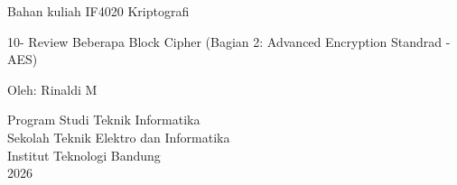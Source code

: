 \documentclass{article}
\begin{document}

\begin{center}
Bahan kuliah IF4020 Kriptografi

{\huge \color{red} 10- Review Beberapa Block Cipher}
{\large \color{red} (Bagian 2: Advanced Encryption Standrad - AES)}

\vspace{30mm}

Oleh: Rinaldi M

\vspace{10mm}

Program Studi Teknik Informatika\\
Sekolah Teknik Elektro dan Informatika\\
Institut Teknologi Bandung\\
2026
\end{center}
\end{document}
